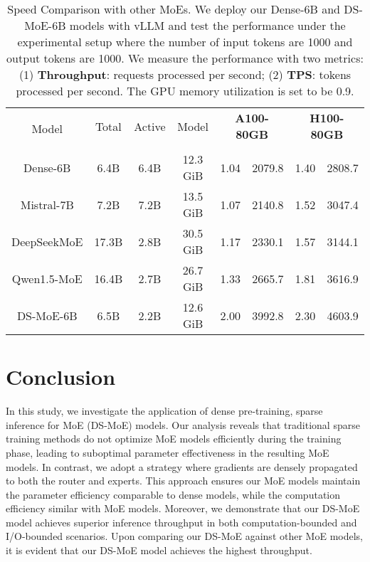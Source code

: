 \begin{table*}[h]
    \centering
    \small
    \caption{Speed Comparison with other MoEs. We deploy our Dense-6B and DS-MoE-6B models with vLLM \cite{kwon2023efficient} and test the performance under the experimental setup where the number of input tokens are 1000 and output tokens are 1000. We measure the performance with two metrics: (1) \textbf{Throughput}: requests processed per second; (2) \textbf{TPS}: tokens processed per second. The GPU memory utilization is set to be 0.9.}
    \begin{tabular}{c|ccc|cc|cc}
        \toprule
        \multirow{3}{*}{Model} & \multirow{2}{*}{Total} & \multirow{2}{*}{Active} & \multirow{2}{*}{Model} & \multicolumn{2}{c|}{\multirow{2}{*}{\textbf{A100-80GB}}} & \multicolumn{2}{c}{\multirow{2}{*}{\textbf{H100-80GB}}} \\
         & \multirow{2}{*}{Params} & \multirow{2}{*}{Params} & \multirow{2}{*}{Memory} & \multirow{2}{*}{Throughput} & \multirow{2}{*}{TPS} & \multirow{2}{*}{Throughput} & \multirow{2}{*}{TPS}\\
         & & & & & & & \\
        \midrule
        Dense-6B & 6.4B & 6.4B & 12.3 GiB & 1.04 & 2079.8 & 1.40 & 2808.7 \\
        Mistral-7B & 7.2B & 7.2B & 13.5 GiB & 1.07 & 2140.8 & 1.52 & 3047.4 \\
        DeepSeekMoE & 17.3B & 2.8B & 30.5 GiB & 1.17 & 2330.1 & 1.57 & 3144.1 \\
        Qwen1.5-MoE & 16.4B & 2.7B & 26.7 GiB & 1.33 & 2665.7 & 1.81 & 3616.9 \\
        DS-MoE-6B & 6.5B & 2.2B & 12.6 GiB & 2.00 & 3992.8 & 2.30 & 4603.9 \\
        \bottomrule
    \end{tabular}
    \label{tab:speed-comparison}
\end{table*}

\section{Conclusion}
In this study, we investigate the application of dense pre-training, sparse inference for MoE (DS-MoE) models. Our analysis reveals that traditional sparse training methods do not optimize MoE models efficiently during the training phase, leading to suboptimal parameter effectiveness in the resulting MoE models. In contrast, we adopt a strategy where gradients are densely propagated to both the router and experts. This approach ensures our MoE models maintain the parameter efficiency comparable to dense models, while the computation efficiency similar with MoE models. Moreover, we demonstrate that our DS-MoE model achieves superior inference throughput in both computation-bounded and I/O-bounded scenarios. Upon comparing our DS-MoE against other MoE models, it is evident that our DS-MoE model achieves the highest throughput.

